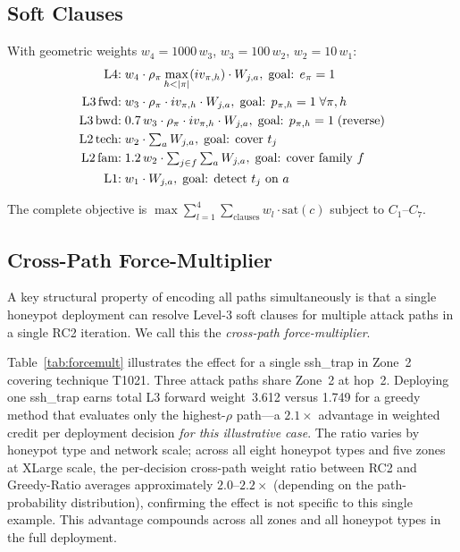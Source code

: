 \documentclass[journal]{IEEEtran}
\begin{document}
\subsection{Soft Clauses}
\label{sec:model:soft}

With geometric weights $w_4=1000\,w_3$, $w_3=100\,w_2$,
$w_2=10\,w_1$:
\begin{align}
  \text{L4:}& \; w_4\cdot\rho_\pi
    \max_{h<|\pi|}(iv_{\pi,h})\cdot W_{j,a}, \;
    \text{goal: }e_\pi=1 \label{eq:L4}\\
  \text{L3\,fwd:}& \; w_3\cdot\rho_\pi\cdot iv_{\pi,h}
    \cdot W_{j,a}, \;
    \text{goal: }p_{\pi,h}=1\;\forall\pi,h \label{eq:L3f}\\
  \text{L3\,bwd:}& \; 0.7\,w_3\cdot\rho_\pi\cdot iv_{\pi,h}
    \cdot W_{j,a}, \;
    \text{goal: }p_{\pi,h}=1\;\text{(reverse)} \label{eq:L3b}\\
  \text{L2\,tech:}& \; w_2\cdot\textstyle\sum_a W_{j,a}, \;
    \text{goal: cover }t_j \label{eq:L2t}\\
  \text{L2\,fam:}& \; 1.2\,w_2\cdot
    \textstyle\sum_{j\in f}\sum_a W_{j,a}, \;
    \text{goal: cover family }f \label{eq:L2f}\\
  \text{L1:}& \; w_1\cdot W_{j,a}, \;
    \text{goal: detect }t_j\text{ on }a \label{eq:L1}
\end{align}

The complete objective is
$\max\sum_{l=1}^{4}\sum_\text{clauses}w_l\cdot\mathrm{sat}(c)$
subject to $C_1$--$C_7$.

\subsection{Cross-Path Force-Multiplier}
\label{sec:forcemult}

A key structural property of encoding all paths simultaneously is
that a single honeypot deployment can resolve Level-3 soft clauses
for multiple attack paths in a single RC2 iteration. We call this the
\emph{cross-path force-multiplier}.

Table~\ref{tab:forcemult} illustrates the effect for a single
ssh\_trap in Zone~2 covering technique T1021. Three attack paths
share Zone~2 at hop~2. Deploying one ssh\_trap earns total L3
forward weight~3.612 versus 1.749 for a greedy method that evaluates
only the highest-$\rho$ path---a $2.1\times$ advantage in weighted
credit per deployment decision \emph{for this illustrative case}.
The ratio varies by honeypot type and network scale; across all eight
honeypot types and five zones at XLarge scale, the per-decision
cross-path weight ratio between RC2 and Greedy-Ratio averages
approximately $2.0$--$2.2\times$ (depending on the path-probability
distribution), confirming the effect is not specific to this single
example. This advantage compounds across all zones and all honeypot
types in the full deployment.
\end{document}
